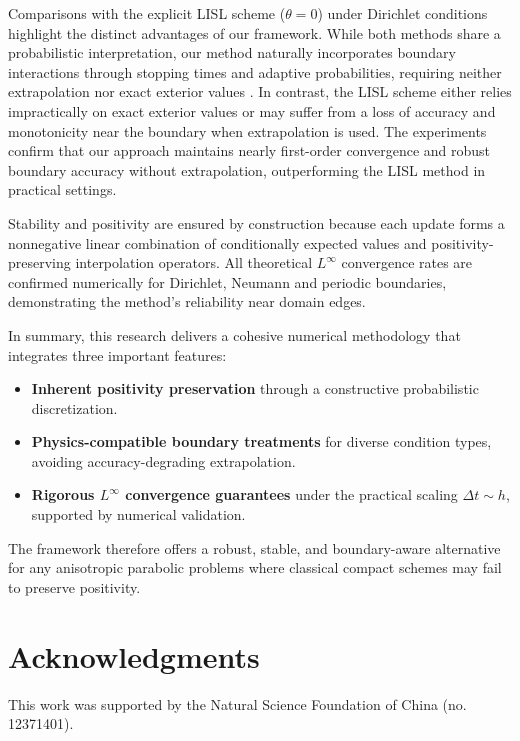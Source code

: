 \documentclass[11pt]{article}
\theoremstyle{mythm}
\theoremstyle{definition}
\begin{document}
	Comparisons with the explicit LISL scheme (\( \theta = 0 \)) under Dirichlet conditions highlight the distinct advantages of our framework. While both methods share a probabilistic interpretation, our method naturally incorporates boundary interactions through stopping times and adaptive probabilities, requiring neither extrapolation nor exact
	exterior values . In contrast, the LISL scheme either relies impractically on exact exterior values or may suffer from a loss of accuracy and monotonicity near the boundary when extrapolation is used. The experiments confirm that our approach maintains nearly first-order convergence and robust boundary accuracy without extrapolation, outperforming the LISL method in practical settings.
	
	Stability and positivity are ensured by construction because each update forms a nonnegative linear combination of conditionally expected values and positivity-preserving interpolation operators. All theoretical \(L^\infty\) convergence rates are confirmed numerically for Dirichlet, Neumann and periodic boundaries, demonstrating the method's reliability near domain edges.
	
	
	In summary, this research delivers a cohesive numerical methodology that integrates three important features:
	\begin{itemize}
		\item \textbf{Inherent positivity preservation} through a constructive probabilistic discretization.
		\item \textbf{Physics-compatible boundary treatments} for diverse condition types, avoiding accuracy-degrading extrapolation.
		\item \textbf{Rigorous \(L^\infty\) convergence guarantees} under the practical scaling \(\Delta t \sim h\), supported by numerical validation.
	\end{itemize}
	
	The framework therefore offers a robust, stable, and boundary-aware alternative for any anisotropic parabolic problems where classical compact schemes may fail to preserve positivity.
	
	\section*{Acknowledgments}
	
	This work was supported by the Natural Science Foundation of China (no. 12371401).
	
\end{document}
